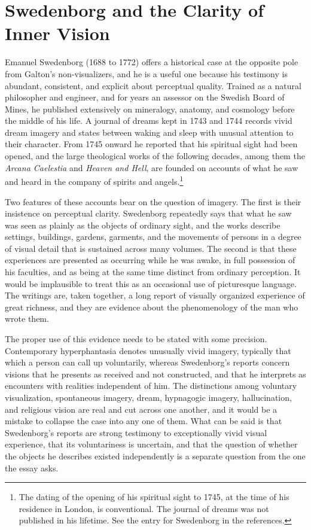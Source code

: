 \documentclass[11pt]{article}
\theoremstyle{remark}
\begin{document}
\section{Swedenborg and the Clarity of Inner Vision}

Emanuel Swedenborg (1688 to 1772) offers a historical case at the opposite pole from Galton's non-visualizers, and he is a useful one because his testimony is abundant, consistent, and explicit about perceptual quality. Trained as a natural philosopher and engineer, and for years an assessor on the Swedish Board of Mines, he published extensively on mineralogy, anatomy, and cosmology before the middle of his life. A journal of dreams kept in 1743 and 1744 records vivid dream imagery and states between waking and sleep with unusual attention to their character. From 1745 onward he reported that his spiritual sight had been opened, and the large theological works of the following decades, among them the \emph{Arcana Caelestia} and \emph{Heaven and Hell}, are founded on accounts of what he saw and heard in the company of spirits and angels.\footnote{The dating of the opening of his spiritual sight to 1745, at the time of his residence in London, is conventional. The journal of dreams was not published in his lifetime. See the entry for Swedenborg in the references.}

Two features of these accounts bear on the question of imagery. The first is their insistence on perceptual clarity. Swedenborg repeatedly says that what he saw was seen as plainly as the objects of ordinary sight, and the works describe settings, buildings, gardens, garments, and the movements of persons in a degree of visual detail that is sustained across many volumes. The second is that these experiences are presented as occurring while he was awake, in full possession of his faculties, and as being at the same time distinct from ordinary perception. It would be implausible to treat this as an occasional use of picturesque language. The writings are, taken together, a long report of visually organized experience of great richness, and they are evidence about the phenomenology of the man who wrote them.

The proper use of this evidence needs to be stated with some precision. Contemporary hyperphantasia denotes unusually vivid imagery, typically that which a person can call up voluntarily, whereas Swedenborg's reports concern visions that he presents as received and not constructed, and that he interprets as encounters with realities independent of him. The distinctions among voluntary visualization, spontaneous imagery, dream, hypnagogic imagery, hallucination, and religious vision are real and cut across one another, and it would be a mistake to collapse the case into any one of them. What can be said is that Swedenborg's reports are strong testimony to exceptionally vivid visual experience, that its voluntariness is uncertain, and that the question of whether the objects he describes existed independently is a separate question from the one the essay asks.
\end{document}
